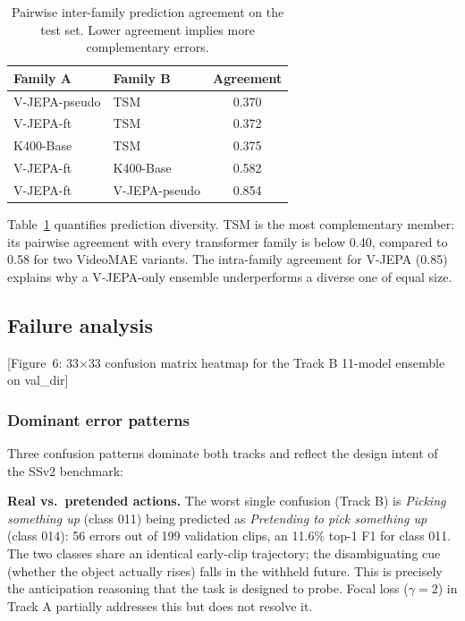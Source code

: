 \documentclass[10pt,twocolumn,letterpaper]{article}
\begin{document}
\begin{table}[!t]
\centering
\caption{Pairwise inter-family prediction agreement on the test set.
  Lower agreement implies more complementary errors.}
\label{tab:diversity}
\small
\setlength{\tabcolsep}{3pt}
\begin{tabular}{llc}
\toprule
\textbf{Family A} & \textbf{Family B} & \textbf{Agreement}\\
\midrule
V-JEPA-pseudo & TSM & 0.370\\
V-JEPA-ft & TSM & 0.372\\
K400-Base & TSM & 0.375\\
V-JEPA-ft & K400-Base & 0.582\\
V-JEPA-ft & V-JEPA-pseudo & 0.854\\
\bottomrule
\end{tabular}
\end{table}

Table~\ref{tab:diversity} quantifies prediction diversity.  TSM is the
most complementary member: its pairwise agreement with every transformer
family is below 0.40, compared to 0.58 for two VideoMAE variants.  The
intra-family agreement for V-JEPA (0.85) explains why a V-JEPA-only
ensemble underperforms a diverse one of equal size.

\subsection{Failure analysis}

[Figure~6: 33$\times$33 confusion matrix heatmap for the Track B
11-model ensemble on val\_dir]

\subsubsection{Dominant error patterns}

Three confusion patterns dominate both tracks and reflect the design
intent of the SSv2 benchmark:

\textbf{Real vs.\ pretended actions.}  The worst single confusion (Track B)
is \emph{Picking something up} (class 011) being predicted as
\emph{Pretending to pick something up} (class 014): 56 errors out of
199 validation clips, an 11.6\% top-1 F1 for class 011.  The two classes
share an identical early-clip trajectory; the disambiguating cue
(whether the object actually rises) falls in the withheld future.  This
is precisely the anticipation reasoning that the task is designed to
probe.  Focal loss ($\gamma{=}2$) in Track A partially addresses this but
does not resolve it.
\end{document}
